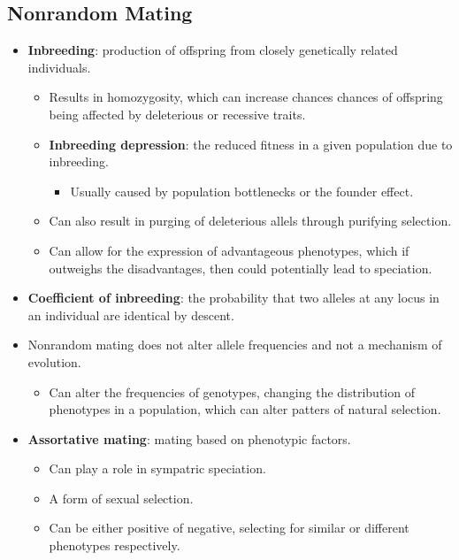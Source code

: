 \documentclass[12pt,a4paper]{article}
\begin{document}
\subsection{Nonrandom Mating}
\begin{itemize}
    \item \textbf{Inbreeding}: production of offspring from closely genetically related individuals.
        \begin{itemize}
            \item Results in homozygosity, which can increase chances chances of offspring being affected by deleterious or recessive traits.
            \item \textbf{Inbreeding depression}: the reduced fitness in a given population due to inbreeding.
                \begin{itemize}
                    \item Usually caused by population bottlenecks or the founder effect.
                \end{itemize}
            \item Can also result in purging of deleterious allels through purifying selection.
            \item Can allow for the expression of advantageous phenotypes, which if outweighs the disadvantages, then could potentially lead to speciation.
        \end{itemize}
    \item \textbf{Coefficient of inbreeding}: the probability that two alleles at any locus in an individual are identical by descent.
    \item Nonrandom mating does not alter allele frequencies and not a mechanism of evolution.
        \begin{itemize}
            \item Can alter the frequencies of genotypes, changing the distribution of phenotypes in a population, which can alter patters of natural selection.
        \end{itemize}
    \item \textbf{Assortative mating}: mating based on phenotypic factors.
        \begin{itemize}
            \item Can play a role in sympatric speciation.
            \item A form of sexual selection.
            \item Can be either positive of negative, selecting for similar or different phenotypes respectively.
        \end{itemize}
\end{itemize}
\end{document}
